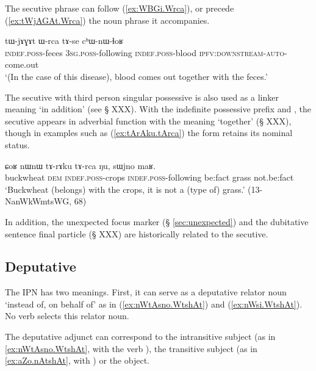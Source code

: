 The secutive phrase can follow  (\ref{ex:WBGi.Wrca}), or precede (\ref{ex:tWjAGAt.Wrca}) the noun phrase it accompanies.

\begin{exe}
\ex \label{ex:tWjAGAt.Wrca}
 \gll   tɯ-jɤɣɤt ɯ-rca tɤ-se cʰɯ-nɯ-ɬoʁ \\
 \textsc{indef}.\textsc{poss}-feces \textsc{3sg}.\textsc{poss}-following \textsc{indef}.\textsc{poss}-blood \textsc{ipfv}:\textsc{downstream}-\textsc{auto}-come.out \\
 \glt `(In the case of this disease), blood comes out together with the feces.' 
 \end{exe}

The secutive with third person singular possessive  is also used as a linker meaning `in addition' (see § XXX). With the indefinite possessive prefix  and  , the secutive appears in adverbial function with the meaning `together' (§ XXX), though in examples such as  (\ref{ex:tArAku.tArca}) the form   retains its nominal status.


\begin{exe}
\ex \label{ex:tArAku.tArca}
 \gll ɕoʁ nɯnɯ tɤ-rɤku tɤ-rca ŋu, sɯjno maʁ. \\
 buckwheat \textsc{dem} \textsc{indef}.\textsc{poss}-crops \textsc{indef}.\textsc{poss}-following be:fact grass not.be:fact \\
 \glt `Buckwheat (belongs) with the crops, it is not a (type of) grass.' (13-NanWkWmtsWG, 68)
\end{exe}

In addition, the unexpected focus marker  (§ \ref{sec:unexpected}) and the dubitative sentence final particle  (§ XXX) are historically related to the secutive.

\subsection{Deputative} \label{sec:deputative} 
The IPN  has two meanings. First, it can serve as a deputative relator noun `instead of, on behalf of' as in (\ref{ex:nWtAsno.WtshAt}) and (\ref{ex:nWsi.WtshAt}). No verb selects this relator noun. 

The deputative adjunct can correspond to the intransitive subject (as in \ref{ex:nWtAsno.WtshAt}, with the verb ), the transitive subject (as in \ref{ex:aZo.nAtshAt}, with ) or the object.

